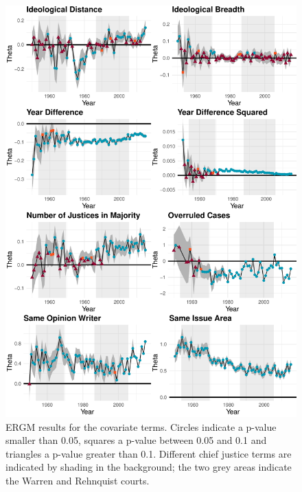 \documentclass{cup-pan}
\begin{document}
\begin{figure}
\centering
\includegraphics[width=14cm ]{SCC_results_2.pdf}
\caption{ERGM results for the covariate terms. Circles indicate a p-value smaller than 0.05, squares a p-value between 0.05 and 0.1 and triangles a p-value greater than 0.1. Different chief justice terms are indicated by shading in the background; the two grey areas indicate the Warren and Rehnquist courts.}
 \label{SCC_results_2}
\end{figure}

\end{document}
